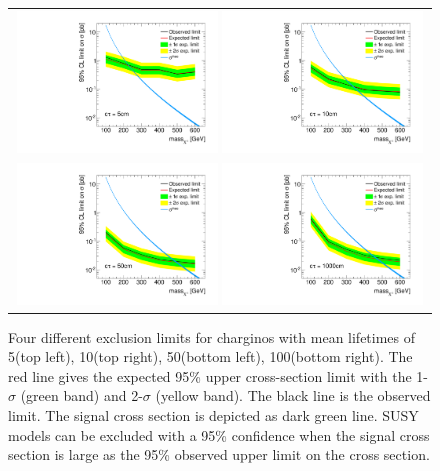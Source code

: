\begin{figure}[!h]
  \centering 
  \begin{tabular}{c}
    \includegraphics[width=0.49\textwidth]{figures/analysis/Interpretation/ExclusionLimits/LimitPlot_ctau5cm.pdf} 
    \includegraphics[width=0.49\textwidth]{figures/analysis/Interpretation/ExclusionLimits/LimitPlot_ctau10cm.pdf} \\
    \includegraphics[width=0.49\textwidth]{figures/analysis/Interpretation/ExclusionLimits/LimitPlot_ctau50cm.pdf} 
    \includegraphics[width=0.49\textwidth]{figures/analysis/Interpretation/ExclusionLimits/LimitPlot_ctau1000cm.pdf} 
  \end{tabular}
  \caption{Four different exclusion limits for charginos with mean lifetimes of 5\cm (top left), 10\cm (top right), 50\cm (bottom left), 100\cm (bottom right).
           The red line gives the expected 95\% upper cross-section limit with the 1-$\sigma$ (green band) and 2-$\sigma$ (yellow band).
           The black line is the observed limit.
           The signal cross section is depicted as dark green line. 
           SUSY models can be excluded with a 95\% confidence when the signal cross section is large as the 95\% observed upper limit on the cross section.}
  \label{fig:1dLimits}
\end{figure} 
